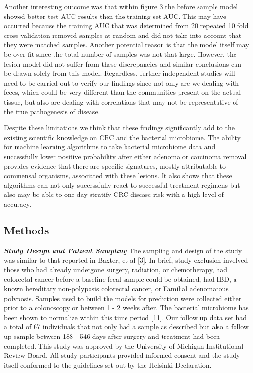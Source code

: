 \documentclass[12pt,]{article}
\begin{document}
Another interesting outcome was that within figure 3 the before sample
model showed better test AUC results then the training set AUC. This may
have occurred because the training AUC that was determined from 20
repeated 10 fold cross validation removed samples at random and did not
take into account that they were matched samples. Another potential
reason is that the model itself may be over-fit since the total number
of samples was not that large. However, the lesion model did not suffer
from these discrepancies and similar conclusions can be drawn solely
from this model. Regardless, further independent studies will need to be
carried out to verify our findings since not only are we dealing with
feces, which could be very different than the communities present on the
actual tissue, but also are dealing with correlations that may not be
representative of the true pathogenesis of disease.

Despite these limitations we think that these findings significantly add
to the existing scientific knowledge on CRC and the bacterial
microbiome. The ability for machine learning algorithms to take
bacterial microbiome data and successfully lower positive probability
after either adenoma or carcinoma removal provides evidence that there
are specific signatures, mostly attributable to commensal organisms,
associated with these lesions. It also shows that these algorithms can
not only successfully react to successful treatment regimens but also
may be able to one day stratify CRC disease risk with a high level of
accuracy.

\newpage

\subsection{Methods}\label{methods}

\textbf{\emph{Study Design and Patient Sampling}} The sampling and
design of the study was similar to that reported in Baxter, et al
{[}3{]}. In brief, study exclusion involved those who had already
undergone surgery, radiation, or chemotherapy, had colorectal cancer
before a baseline fecal sample could be obtained, had IBD, a known
hereditary non-polyposis colorectal cancer, or Familial adenomatous
polyposis. Samples used to build the models for prediction were
collected either prior to a colonoscopy or between 1 - 2 weeks after.
The bacterial microbiome has been shown to normalize within this time
period {[}11{]}. Our follow up data set had a total of 67 individuals
that not only had a sample as described but also a follow up sample
between 188 - 546 days after surgery and treatment had been completed.
This study was approved by the University of Michigan Institutional
Review Board. All study participants provided informed consent and the
study itself conformed to the guidelines set out by the Helsinki
Declaration.
\end{document}
